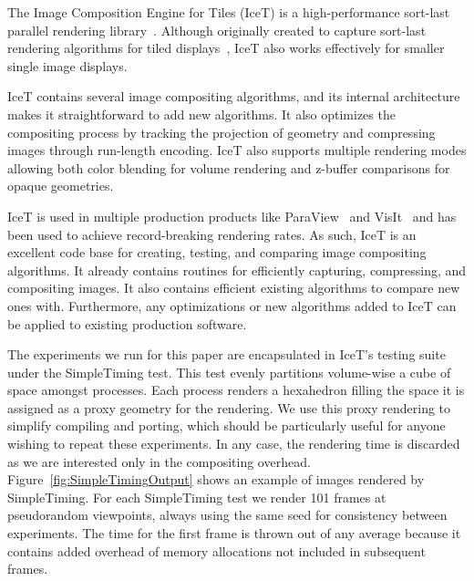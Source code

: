 \documentclass{sig-alternate}
\newcommand*{\lcite}[1]{~\cite{#1}}
\begin{document}
The Image Composition Engine for Tiles (IceT) is a high-performance
sort-last parallel rendering library\lcite{IceT}.  Although originally
created to capture sort-last rendering algorithms for tiled
displays\lcite{Moreland2001}, IceT also works effectively for smaller
single image displays.

IceT contains several image compositing algorithms, and its internal
architecture makes it straightforward to add new algorithms.  It also
optimizes the compositing process by tracking the projection of geometry
and compressing images through run-length encoding.  IceT also supports
multiple rendering modes allowing both color blending for volume rendering
and z-buffer comparisons for opaque geometries.

IceT is used in multiple production products like ParaView\lcite{ParaView}
and VisIt\lcite{VisIt} and has been used to achieve record-breaking
rendering rates.  As such, IceT is an excellent code base
for creating, testing, and comparing image compositing algorithms.  It
already contains routines for efficiently capturing, compressing, and
compositing images.  It also contains efficient existing algorithms to
compare new ones with.  Furthermore, any optimizations or new algorithms
added to IceT can be applied to existing production software.

The experiments we run for this paper are encapsulated in IceT's testing
suite under the SimpleTiming test.  This test evenly partitions volume-wise
a cube of space amongst processes.  Each process renders a hexahedron
filling the space it is assigned as a proxy geometry for the rendering.  We
use this proxy rendering to simplify compiling and porting, which should be
particularly useful for anyone wishing to repeat these experiments.  In any
case, the rendering time is discarded as we are interested only in the
compositing overhead.  Figure~\ref{fig:SimpleTimingOutput} shows an example
of images rendered by SimpleTiming.  For each SimpleTiming test we render
101 frames at pseudorandom viewpoints, always using the same seed for
consistency between experiments.  The time for the first frame is thrown
out of any average because it contains added overhead of memory allocations
not included in subsequent frames.
\end{document}
